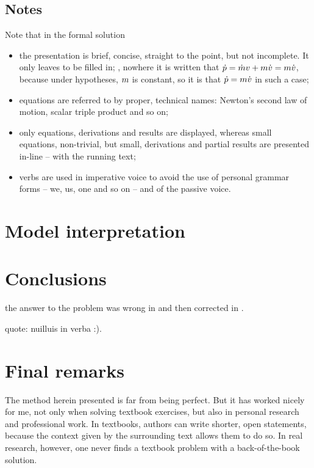 \subsection{Notes}
%
Note that in the formal solution
%
\begin{itemize}
%
\item the presentation is brief, concise, straight to the point, but not incomplete. It only leaves  to be filled in; \eg, nowhere it is written that $\dot{p} = \dot{m}v + m\dot{v} = m\dot{v}$, because under hypotheses, $m$ is constant, so it is  that $\dot{p} = m\dot{v}$ in such a case;
%
\item equations are referred to by proper, technical names: Newton's second law of motion, scalar triple product and so on;
%
\item only  equations, derivations and results are displayed, whereas small equations, non-trivial, but small, derivations and partial results are presented in-line -- with the running text;
%
\item verbs are used in imperative voice to avoid the use of personal grammar forms -- we, us, one and so on -- and of the passive voice.
%
\end{itemize}


\section{Model interpretation}
%


\section{Conclusions}
%
the answer to the problem was wrong in \cite{thorne:2011} and then corrected in \cite{thorne:2013}.

quote: nuilluis in verba :).


\section{Final remarks}
%
The method herein presented is far from being perfect. But it has worked nicely for me, not only when solving textbook exercises, but also in personal research and professional work. In textbooks, authors can write shorter, open statements, because the context given by the surrounding text allows them to do so. In real research, however, one never finds a textbook problem with a back-of-the-book solution.

